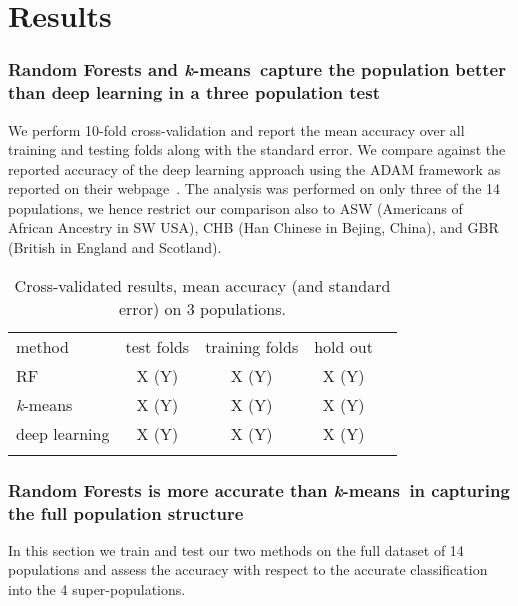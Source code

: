 \documentclass{llncs}
\newcommand{\kMeans}{\textit{k}-means}
\begin{document}
{%
\section{Results}
%
\subsubsection{Random Forests and \kMeans\ capture the population better than deep learning in a three population test}
We perform 10-fold cross-validation and report the mean accuracy over all training and testing folds along with the standard error.
We compare against the reported accuracy of the deep learning approach using the ADAM framework as reported on their webpage~\cite{Ferguson}. 
The analysis was performed on only three of the 14 populations, we hence restrict our comparison also to ASW (Americans of African Ancestry in SW USA), CHB (Han Chinese in Bejing, China), and GBR (British in England and Scotland).


\begin{table}
\caption{Cross-validated results, mean accuracy (and standard error) on 3 populations.}
\begin{center}
\renewcommand{\arraystretch}{1.4}
\setlength\tabcolsep{3pt}
\begin{tabular}{lcccc}
\hline\noalign{\smallskip}
method  & test folds & training folds & hold out \\
RF  & X (Y) & X (Y) & X (Y) \\
\kMeans & X (Y) & X (Y) & X (Y) \\
deep learning & X (Y) & X (Y) & X (Y) \\
\noalign{\smallskip}
\hline
\end{tabular}
\end{center}
\end{table}

\subsubsection{Random Forests is more accurate than \kMeans\ in capturing the full population structure}
In this section we train and test our two methods on the full dataset of 14 populations and assess the accuracy with respect to the accurate classification into the 4 super-populations. 

}
\end{document}
